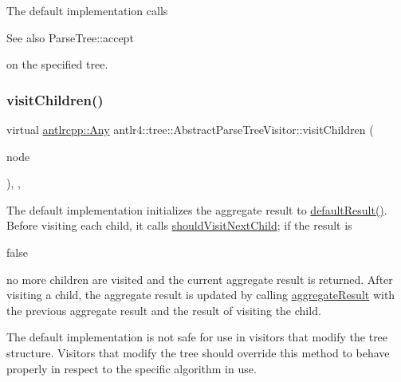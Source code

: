 The default implementation calls \begin{DoxySeeAlso}{See also}
Parse\+Tree\+::accept


\end{DoxySeeAlso}
on the specified tree. \mbox{\label{classantlr4_1_1tree_1_1AbstractParseTreeVisitor_a38605a51f1b8828eedb2f2ccb9e6c705}} 
\subsubsection{\texorpdfstring{visit\+Children()}{visitChildren()}}
{\footnotesize\ttfamily virtual \hyperlink{structantlrcpp_1_1Any}{antlrcpp\+::\+Any} antlr4\+::tree\+::\+Abstract\+Parse\+Tree\+Visitor\+::visit\+Children (\begin{DoxyParamCaption}\item[{\hyperlink{classantlr4_1_1tree_1_1ParseTree}{Parse\+Tree} $\ast$}]{node }\end{DoxyParamCaption})\hspace{0.3cm}{\ttfamily [inline]}, {\ttfamily [override]}, {\ttfamily [virtual]}}

The default implementation initializes the aggregate result to \hyperlink{}{default\+Result()}. Before visiting each child, it calls \hyperlink{}{should\+Visit\+Next\+Child}; if the result is
\begin{DoxyCode}
\textcolor{keyword}{false} 
\end{DoxyCode}
 no more children are visited and the current aggregate result is returned. After visiting a child, the aggregate result is updated by calling \hyperlink{}{aggregate\+Result} with the previous aggregate result and the result of visiting the child.

The default implementation is not safe for use in visitors that modify the tree structure. Visitors that modify the tree should override this method to behave properly in respect to the specific algorithm in use.\mbox{\label{classantlr4_1_1tree_1_1AbstractParseTreeVisitor_a4cd5f0eaaf54140af51f1549d0a6b62d}} 
